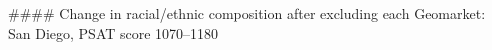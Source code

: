 #### Change in racial/ethnic composition after excluding each Geomarket: San Diego, PSAT score 1070–1180
